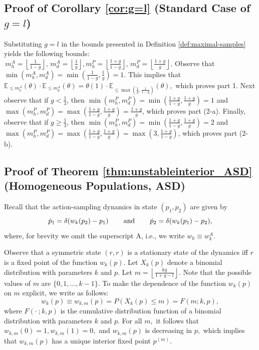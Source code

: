 \documentclass[12pt]{article}
\numberwithin{equation}{section}
\numberwithin{figure}{section}
\theoremstyle{definition}
\theoremstyle{plain}
\theoremstyle{plain}
\theoremstyle{plain}
\theoremstyle{remark}
\theoremstyle{plain}
\theoremstyle{plain}
\begin{document}
\subsection{Proof of Corollary \ref{cor:g=l}\label{proof-cor-g=l} (Standard Case of $g=l$)}
Substituting $g=l$ in  the bounds presented in Definition \ref{def:maximal-samples} yields the following bounds: 
 $\,m_{h}^{A}=\left\lfloor \frac{1}{1-g}\right\rfloor ,\,m_{d}^{A}=\left\lfloor \frac{1}{g}\right\rfloor,
 m_{h}^{P}=\left\lfloor \frac{1+g}{1-g}\right\rfloor ,\,m_{d}^{P}=\left\lfloor \frac{1+g}{g}\right\rfloor.$
 Observe that $\min(m_{h}^{A},m_{d}^{A})=\min( \frac{1}{1-g}, \frac{1}{g})=1$. This implies that  
 $\mathbb{E}_{\leq m_{h}^A}\left(\theta\right)\cdot \mathbb{E}_{\leq m_{d}^A}\left(\theta\right)=\theta(1)\cdot\mathbb{E}_{\leq \max\left(\frac{1}{g},\frac{1}{1-g}\right)}\left(\theta\right),$ which proves part 1.
 Next observe that if $g<\frac{1}{3}$, then  $\min(m_{h}^{P},m_{d}^{P})=\min(\frac{1+g}{1-g},\frac{1+g}{g})=1$ and $\max(m_{h}^{P},m_{d}^{P})=\max(\frac{1+g}{1-g},\frac{1+g}{g})=\frac{1+g}{g}$, which proves part (2-a). Finally, observe that if $g\geq\frac{1}{3}$, then 
 $\min(m_{h}^{P},m_{d}^{P})=\min(\frac{1+g}{1-g},\frac{1+g}{g})=2$ and $\max(m_{h}^{P},m_{d}^{P})=\max(\frac{1+g}{1-g},\frac{1+g}{g})=\max(3,\frac{1+g}{1-g})$, which proves part (2-b).
 
\subsection{Proof of Theorem \ref{thm:unstableinterior_ASD} (Homogeneous Populations, ASD)}\label{subsec:unstableinterior_ASDproof}
Recall that the action-sampling dynamics in state $(p_1,p_2)$ are given by
\begin{equation}\label{eq:Jacobsystem_ASD}
    \dot{p}_1 = \delta(w_k(p_2) - p_1) \hspace{0.3in} \text{and} \hspace{0.3in}
    \dot{p}_2  = \delta(w_k(p_1) - p_2),
\end{equation}
where, for brevity we omit the superscript A, i.e., we write $w_k \equiv w^A_k.$

Observe that a symmetric state $(r,r)$ 
is a stationary state of the dynamics iff $r$ is a fixed point of the function $w_k(p).$ Let $X_k(p)$ denote a binomial distribution with parameters $k$ and $p.$ Let  $m = \left\lfloor \frac{kg}{1+g-l}\right\rfloor.$ Note that the possible values of $m$ are $\{0,1,\dots,k-1\}.$ To make the dependence of the function $w_k(p)$ on $m$ explicit, we write as follows:
\begin{equation}\label{eq:wkmp}
w_k(p) \equiv w_{k,m}(p)= P(X_k(p) \leq m) = F(m;k,p),
\end{equation}
where $F(\cdot \ ;k,p)$ is the cumulative distribution function of a binomial distribution with parameters $k$ and $p.$ For all $m,$ it follows that $w_{k,m}(0)=1, w_{k,m}(1) =0,$ and $w_{k,m}(p)$ is decreasing in $p,$ which implies that $w_{k,m}(p)$ has a unique interior fixed point $p^{(m)}.$ 
\end{document}

